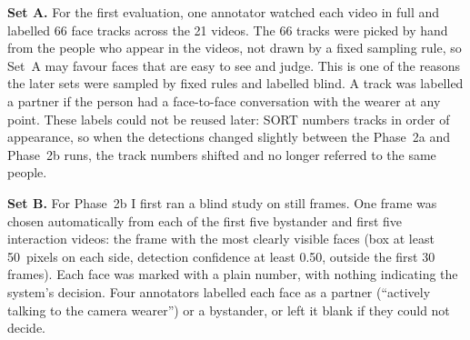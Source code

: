 \begin{table}[htbp]
\begin{singlespace}
\centering
\caption{Labelled sets used for evaluation. Each data point is one person (face track)
judged as an interaction partner or a bystander.}
\label{tab:gtsets}
\renewcommand{\arraystretch}{1.3}
\end{singlespace}
\end{table}

\textbf{Set A.} For the first evaluation, one annotator watched each video in full and
labelled 66 face tracks across the 21 videos. The 66 tracks were picked by hand from the people who
appear in the videos, not drawn by a fixed sampling rule, so Set~A may favour faces that
are easy to see and judge. This is one of the reasons the later sets were sampled by fixed
rules and labelled blind.
A track was labelled a partner if the person had a face-to-face conversation with the
wearer at any point. These labels could not be reused later: SORT numbers tracks in order
of appearance, so when the detections changed slightly between the Phase~2a and Phase~2b
runs, the track numbers shifted and no longer referred to the same people.

\textbf{Set B.} For Phase~2b I first ran a blind study on still frames. One frame was
chosen automatically from each of the first five bystander and first five interaction
videos: the frame with the most clearly visible faces (box at least 50~pixels on each
side, detection confidence at least 0.50, outside the first 30 frames). Each face was
marked with a plain number, with nothing indicating the system's decision. Four annotators
labelled each face as a partner (``actively talking to the camera wearer'') or a
bystander, or left it blank if they could not decide.

